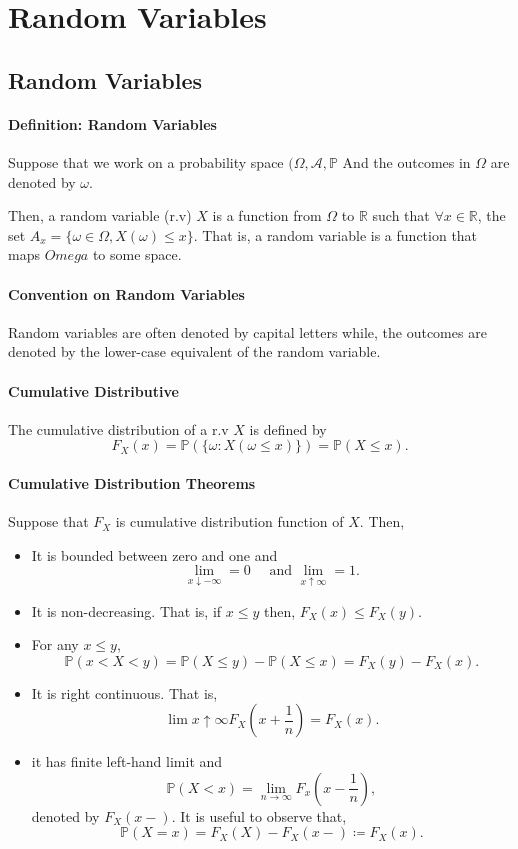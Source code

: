 
\section{Random Variables}

\subsection{Random Variables}

\paragraph{Definition: Random Variables}
Suppose that we work on a probability space \((\Omega, \mathcal{A}, \mathbb{P}\)
And the outcomes in \(\Omega\) are denoted by \(\omega\).

Then, a random variable (r.v) \(X\) is a function from \(\Omega\) to
\(\mathbb{R}\) such that \(\forall x\in\mathbb{R}\),
the set \(
    A_x = \{\omega\in \Omega, X(\omega) \leq x\}
\).
That is, a random variable is a function that maps \(Omega\) to some space.

\paragraph{Convention on Random Variables}
Random variables are often denoted by capital letters while, the
outcomes are denoted by the lower-case equivalent of the random variable.

\paragraph{Cumulative Distributive}
The cumulative distribution of a r.v \(X\) is defined by
\[
    F_X(x) = \mathbb{P}(\{\omega: X(\omega \leq x)\}) = \mathbb{P}(X\leq x).
\]

\paragraph{Cumulative Distribution Theorems}
Suppose that \(F_X\) is cumulative distribution function of \(X\).
Then,
\begin{itemize}
    \item It is bounded between zero and one and
    \[
        \lim_{x \downarrow -\infty } = 0
        \quad\text{ and }
        \lim_{x\uparrow\infty} = 1.
    \]
    \item It is non-decreasing. That is, if \(x\leq y\) then,
    \(F_X(x) \leq F_X(y)\).
    \item For any \(x \leq y\),
    \[
        \mathbb{P}(x < X < y) = \mathbb{P}(X \leq y) - \mathbb{P}(X\leq x)
        = F_X(y) - F_X(x).
    \]
    \item It is right continuous. That is,
    \[
        \lim{x\uparrow\infty} F_X\left(x + \frac{1}{n}\right) = F_X(x).
    \]
    \item it has finite left-hand limit and
    \[
        \mathbb{P}(X< x)
        =
        \lim_{n\to\infty} F_x\left(x - \frac{1}{n}\right),
    \]
    denoted by \(F_X(x-)\).
    It is useful to observe that,
    \[
        \mathbb{P}(X=x) = F_X(X) - F_X(x-) \coloneqq F_X(x).
    \]
\end{itemize}

